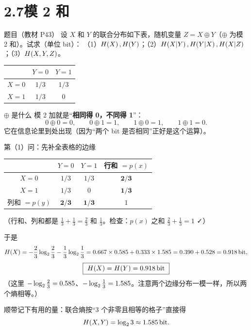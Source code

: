 \documentclass[11pt,a4paper]{ctexart}
\begin{document}
\section{2.7\quad 模 2 和}

\begin{defbox}{题目（教材 P43）}
设 $X$ 和 $Y$ 的联合分布如下表，随机变量 $Z=X\oplus Y$（$\oplus$ 为模 2 和）。试求（单位 bit）：
（1）$H\!\left(X\right),H\!\left(Y\right)$；（2）$H\!\left(X|Y\right),H\!\left(Y|X\right),H\!\left(X|Z\right)$；（3）$H\!\left(X,Y,Z\right)$。
\begin{center}
\renewcommand{\arraystretch}{1.3}
\begin{tabular}{c|cc}
\toprule
 & $Y=0$ & $Y=1$\\
\midrule
$X=0$ & $1/3$ & $1/3$\\
$X=1$ & $1/3$ & $0$\\
\bottomrule
\end{tabular}
\end{center}
\end{defbox}

\begin{idea}{$\oplus$ 是什么}
模 2 加就是“\textbf{相同得 0，不同得 1}”：
\[
0\oplus0=0,\qquad 0\oplus1=1,\qquad 1\oplus0=1,\qquad 1\oplus1=0 .
\]
它在信息论里到处出现（因为“两个 bit 是否相同”正好是这个运算）。
\end{idea}

\begin{calc}{第（1）问：先补全表格的边缘}
\begin{center}
\renewcommand{\arraystretch}{1.3}
\begin{tabular}{c|cc|c}
\toprule
 & $Y=0$ & $Y=1$ & 行和 $=p(x)$\\
\midrule
$X=0$ & $1/3$ & $1/3$ & $\mathbf{2/3}$\\
$X=1$ & $1/3$ & $0$ & $\mathbf{1/3}$\\
\midrule
列和 $=p(y)$ & $\mathbf{2/3}$ & $\mathbf{1/3}$ & $1$\\
\bottomrule
\end{tabular}
\end{center}
（行和、列和都是 $\frac13+\frac13=\frac23$ 和 $\frac13$。检查：$p(x)$ 之和 $\frac23+\frac13=1$ ✓）

于是
\[
H\!\left(X\right)=-\frac23\log_{2}\frac23-\frac13\log_{2}\frac13
=0.667\times0.585+0.333\times1.585=0.390+0.528=0.918\,\text{bit},
\]
\[
\boxed{\ H\!\left(X\right)=H\!\left(Y\right)=0.918\,\text{bit}\ }
\]
（这里 $-\log_{2}\frac23=0.585$、$-\log_{2}\frac13=1.585$。注意两个边缘分布一模一样，所以两个熵相等。）

顺带记下有用的量：联合熵按“3 个非零且相等的格子”直接得
\[
H\!\left(X,Y\right)=\log_{2}3\approx1.585\,\text{bit} .
\]
\end{calc}
\end{document}
